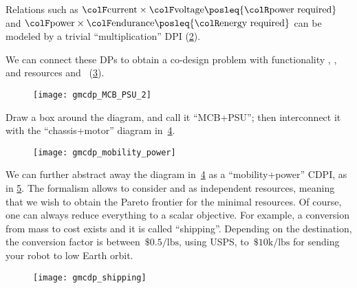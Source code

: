 \begin{example}
    \begin{figure}[h!]
        \centering
        \caption{}
        \label{fig:example-ba}
    \end{figure}

    
    Relations such as ${\colF\mbox{current}}\times{\colF\mbox{voltage}}\posleq{\colR\mbox{power required}}$
    and ${\colF\mbox{power}}\times{\colF\mbox{endurance}}\posleq{\colR\mbox{energy required}}$
    can be modeled by a trivial ``multiplication'' DPI (\cref{fig:current_times_voltage}).

    \begin{figure}[h!]
        \centering
        \caption{}
        \label{fig:current_times_voltage}
    \end{figure}


    We can connect these DPs to obtain a co-design problem with functionality , ,  and resources  and ~(\cref{fig:connect}).

    \begin{figure}[h!]
        \centering
        \texttt{[image: gmcdp\_MCB\_PSU\_2]}
        \caption{}
        \label{fig:connect}
    \end{figure}


    Draw a box around the diagram, and call it ``MCB+PSU'';
    then interconnect it with the ``chassis+motor'' diagram in~\cref{fig:another}.

    \begin{figure}[h!]
        \centering
        \texttt{[image: gmcdp\_mobility\_power]}
        \caption{}
        \label{fig:another}
    \end{figure}

    We can further abstract away the diagram in~\cref{fig:another} as a ``mobility+power'' CDPI, as in \cref{fig:shipping}.
    The formalism allows to consider  and  as independent resources, meaning that we wish to obtain the Pareto frontier for the minimal resources.
    Of course, one can always reduce everything to a scalar objective.
    For example, a conversion from mass to cost exists and it is called ``shipping''.
    Depending on the destination, the conversion factor is between~$\$0.5/\mbox{lbs}$, using USPS, to~$\$10\mbox{k}/\mbox{lbs}$ for sending your robot to low Earth orbit.

    \begin{figure}[h!]
        \centering{}
        \texttt{[image: gmcdp\_shipping]}
        \caption{}
        \label{fig:shipping}
    \end{figure}

\end{example}

